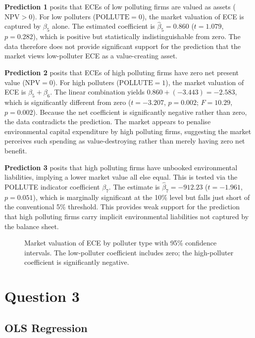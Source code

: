 \documentclass[11pt, a4paper]{article}
\begin{document}
\textbf{Prediction 1} posits that ECEs of low polluting firms are valued as assets (\(\mathrm{NPV} > 0\)). For low polluters (\(\mathrm{POLLUTE} = 0\)), the market valuation of ECE is captured by \(\beta_5\) alone. The estimated coefficient is \(\hat{\beta}_5 = 0.860\) (\(t = 1.079\), \(p = 0.282\)), which is positive but statistically indistinguishable from zero. The data therefore does not provide significant support for the prediction that the market views low-polluter ECE as a value-creating asset.

\textbf{Prediction 2} posits that ECEs of high polluting firms have zero net present value (\(\mathrm{NPV} = 0\)). For high polluters (\(\mathrm{POLLUTE} = 1\)), the market valuation of ECE is \(\beta_5 + \beta_6\). The linear combination yields \(0.860 + (-3.443) = -2.583\), which is significantly different from zero (\(t = -3.207\), \(p = 0.002\); \(F = 10.29\), \(p = 0.002\)). Because the net coefficient is significantly negative rather than zero, the data contradicts the prediction. The market appears to penalise environmental capital expenditure by high polluting firms, suggesting the market perceives such spending as value-destroying rather than merely having zero net benefit.

\textbf{Prediction 3} posits that high polluting firms have unbooked environmental liabilities, implying a lower market value all else equal. This is tested via the POLLUTE indicator coefficient \(\beta_7\). The estimate is \(\hat{\beta}_7 = -912.23\) (\(t = -1.961\), \(p = 0.051\)), which is marginally significant at the 10\% level but falls just short of the conventional 5\% threshold. This provides weak support for the prediction that high polluting firms carry implicit environmental liabilities not captured by the balance sheet.

\begin{figure}[H]
	\centering
	
	\caption{Market valuation of ECE by polluter type with 95\% confidence intervals. The low-polluter coefficient includes zero; the high-polluter coefficient is significantly negative.}\label{fig:q2_ece}
\end{figure}

\clearpage

\section{Question 3}

\subsection{OLS Regression}
\end{document}
